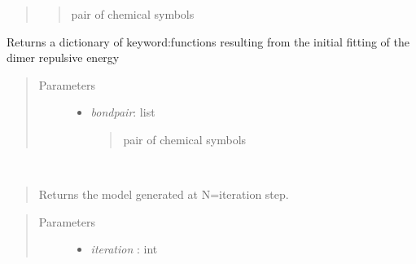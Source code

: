 \documentclass[letterpaper,10pt,english]{sphinxmanual}
\begin{document}
\begin{fulllineitems}
\begin{fulllineitems}
\begin{quote}
\begin{description}
\begin{itemize}
\begin{quote}
pair of chemical symbols
\end{quote}

\end{itemize}

\end{description}\end{quote}

\end{fulllineitems}


\begin{fulllineitems}
\label{classes:catparam.CATParam.get_initial_repparam}
Returns a dictionary of keyword:functions resulting from the initial
fitting of the dimer repulsive energy
\begin{quote}\begin{description}
\item[{Parameters}] \leavevmode\begin{itemize}
\item {} 
\emph{bondpair}: list
\begin{quote}

pair of chemical symbols
\end{quote}

\end{itemize}

\end{description}\end{quote}

\end{fulllineitems}


\begin{fulllineitems}
\label{classes:catparam.CATParam.get_model}~\begin{quote}

Returns the model generated at N=iteration step.
\end{quote}
\begin{quote}\begin{description}
\item[{Parameters}] \leavevmode\begin{itemize}
\item {} 
\emph{iteration} : int
\begin{quote}


\end{quote}
\end{itemize}
\end{description}
\end{quote}
\end{fulllineitems}
\end{fulllineitems}
\end{document}
